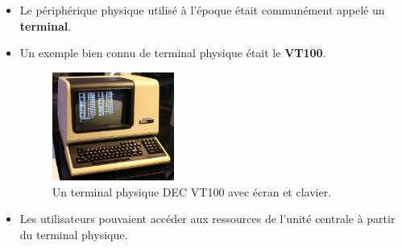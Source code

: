 \begin{frame}

	\begin{itemize}[<+->]
		\item Le périphérique physique utilisé à l'époque était communément appelé un \textbf{terminal}.
		\item Un exemple bien connu de terminal physique était le \textbf{VT100}.

			\begin{figure}
				\centering
				\includegraphics[width=4cm]{images/DEC_VT100_terminal.jpg}
				\caption{Un terminal physique DEC VT100 avec écran et clavier.}
			\end{figure}

		\item Les utilisateurs pouvaient accéder aux ressources de l'unité centrale à partir du terminal physique.
	\end{itemize}

\end{frame}

